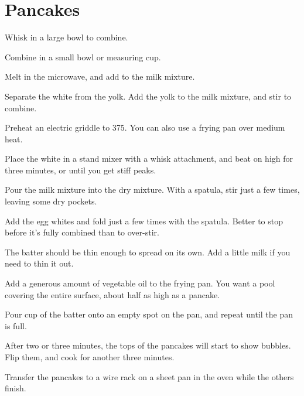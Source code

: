 \section{Pancakes}
\begin{recipe}



Whisk in a large bowl to combine.


Combine in a small bowl or measuring cup.


Melt in the microwave, and add to the milk mixture.


Separate the white from the yolk. Add the yolk to the milk mixture, and stir to combine.

Preheat an electric griddle to 375\degree{}. You can also use a frying pan over medium heat.

Place the white in a stand mixer with a whisk attachment, and beat on high for three minutes, or until you get stiff peaks.

Pour the milk mixture into the dry mixture. With a spatula, stir just a few times, leaving some dry pockets.

Add the egg whites and fold just a few times with the spatula. Better to stop before it's fully combined than to over-stir.

The batter should be thin enough to spread on its own. Add a little milk if you need to thin it out.

Add a generous amount of vegetable oil to the frying pan. You want a pool covering the entire surface, about half as high as a pancake.

Pour  cup of the batter onto an empty spot on the pan, and repeat until the pan is full.

After two or three minutes, the tops of the pancakes will start to show bubbles. Flip them, and cook for another three minutes.

Transfer the pancakes to a wire rack on a sheet pan in the oven while the others finish.

\end{recipe}

